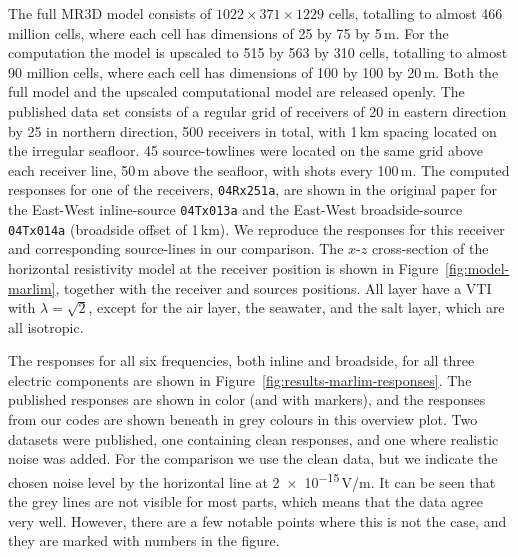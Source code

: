 \documentclass[
    paper,
  ]{geophysics}
\begin{document}
The full MR3D model consists of $1022 \times 371 \times 1229$ cells, totalling to almost 466 million cells, where each cell has dimensions of 25 by 75 by 5\,m. For the computation the model is upscaled to 515 by 563 by 310 cells, totalling to almost 90 million cells, where each cell has dimensions of 100 by 100 by 20\,m. Both the full model and the upscaled computational model are released openly. The published data set consists of a regular grid of receivers of 20 in eastern direction by 25 in northern direction, 500 receivers in total, with 1\,km spacing located on the irregular seafloor. 45 source-towlines were located on the same grid above each receiver line, 50\,m above the seafloor, with shots every 100\,m. The computed responses for one of the receivers, \texttt{04Rx251a}, are shown in the original paper for the East-West inline-source \texttt{04Tx013a} and the East-West broadside-source \texttt{04Tx014a} (broadside offset of 1\,km). We reproduce the responses for this receiver and corresponding source-lines in our comparison. The $x$-$z$ cross-section of the horizontal resistivity model at the receiver position is shown in Figure~\ref{fig:model-marlim}, together with the receiver and sources positions. All layer have a VTI with $\lambda=\sqrt{2}$, except for the air layer, the seawater, and the salt layer, which are all isotropic.

%
%

The responses for all six frequencies, both inline and broadside, for all three electric components are shown in Figure~\ref{fig:results-marlim-responses}. The published responses are shown in color (and with markers), and the responses from our codes are shown beneath in grey colours in this overview plot.
%
%
Two datasets were published, one containing clean responses, and one where realistic noise was added. For the comparison we use the clean data, but we indicate the chosen noise level by the horizontal line at \num{2e-15}\,V/m. It can be seen that the grey lines are not visible for most parts, which means that the data agree very well. However, there are a few notable points where this is not the case, and they are marked with numbers in the figure.
\end{document}
